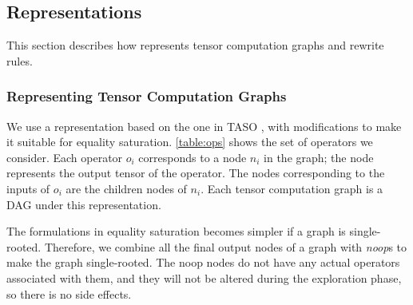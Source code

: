 


\subsection{Representations}

This section describes how \ourname{} represents tensor computation graphs and rewrite rules.

\subsubsection{Representing Tensor Computation Graphs}
\label{sec:language}

We use a representation based on the one in TASO \cite{taso}, with modifications to make it suitable for equality saturation.
\autoref{table:ops} shows the set of operators we consider.
Each operator $o_i$ corresponds to a node $n_i$ in the graph; the node represents the output tensor of the operator.
The nodes corresponding to the inputs of $o_i$ are the children nodes of $n_i$.
Each tensor computation graph is a DAG under this representation.

The formulations in equality saturation becomes simpler if a graph is single-rooted. Therefore, we combine all the final output nodes of a graph with \emph{noop}s to make the graph single-rooted. The noop nodes do not have any actual operators associated with them, and they will not be altered during the exploration phase, so there is no side effects.


